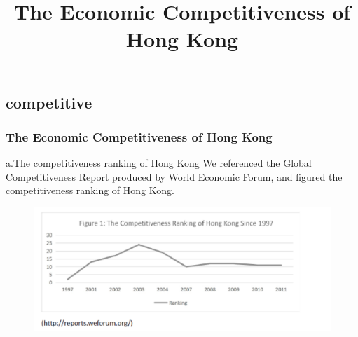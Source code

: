 \documentclass[slidestop,uncompress,mathsans, 12pt]{beamer}
\begin{document}
\subsection{competitive}
\begin{frame}

\title{The Economic Competitiveness of Hong Kong}
\date{}
\titlepage
\end{frame}
\begin{frame}
\frametitle{The Economic Competitiveness of Hong Kong}
a.The competitiveness ranking of Hong Kong
We referenced the Global Competitiveness Report produced by World Economic Forum, and figured the competitiveness ranking of Hong Kong.
\\

\begin{figure}[h]
\raggedleft
\includegraphics[width=1.1\textwidth]{hk4.jpg}
\label{threadsVsSync}
\end{figure}
\end{frame}
\end{document}
